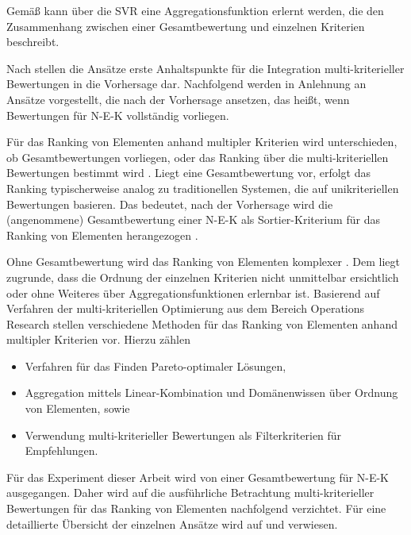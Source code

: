 Gemäß \textcite[S. 675]{jannach:2:article} kann über die \ac{SVR} eine Aggregationsfunktion erlernt werden, die den Zusammenhang zwischen einer Gesamtbewertung und einzelnen Kriterien beschreibt. 

Nach \textcite[S. 866]{adomavicius:4:inbook} stellen die Ansätze erste Anhaltspunkte für die Integration multi-kriterieller Bewertungen in die Vorhersage dar.
Nachfolgend werden in Anlehnung an \textcite[S. 867]{adomavicius:4:inbook} Ansätze vorgestellt, die nach der Vorhersage ansetzen, das heißt, wenn Bewertungen für \ac{N-E-K} vollständig vorliegen.


Für das Ranking von Elementen anhand multipler Kriterien wird unterschieden, ob Gesamtbewertungen vorliegen, oder das Ranking über die multi-kriteriellen Bewertungen bestimmt wird \cite[S. 867]{adomavicius:4:inbook}.
Liegt eine Gesamtbewertung vor, erfolgt das Ranking typischerweise analog zu traditionellen Systemen, die auf unikriteriellen Bewertungen basieren.
Das bedeutet, nach der Vorhersage wird die (angenommene) Gesamtbewertung einer \ac{N-E-K} als Sortier-Kriterium für das Ranking von Elementen herangezogen \cite[S. 867]{adomavicius:4:inbook}.

Ohne Gesamtbewertung wird das Ranking von Elementen komplexer \cite[S. 867]{adomavicius:4:inbook}.
Dem liegt zugrunde, dass die Ordnung der einzelnen Kriterien nicht unmittelbar ersichtlich \cite[S. 867]{adomavicius:4:inbook} oder ohne Weiteres über Aggregationsfunktionen erlernbar ist.
Basierend auf Verfahren der multi-kriteriellen Optimierung aus dem Bereich Operations Research \cite[S. 745]{adomavicius:inproceedings} stellen \textcite[S. 867]{adomavicius:4:inbook} verschiedene Methoden für das Ranking von Elementen anhand multipler Kriterien vor.
Hierzu zählen
\begin{itemize}
    \item Verfahren für das Finden Pareto-optimaler Lösungen,
    \item Aggregation mittels Linear-Kombination und Domänenwissen über Ordnung von Elementen, sowie
    \item Verwendung multi-kriterieller Bewertungen als Filterkriterien für Empfehlungen.
\end{itemize}

Für das Experiment dieser Arbeit wird von einer Gesamtbewertung für \ac{N-E-K} ausgegangen.
Daher wird auf die ausführliche Betrachtung multi-kriterieller Bewertungen für das Ranking von Elementen nachfolgend verzichtet.
Für eine detaillierte Übersicht der einzelnen Ansätze wird auf \textcite[S. 745]{adomavicius:inproceedings} und \textcite[S. 868ff.]{adomavicius:4:inbook} verwiesen.

